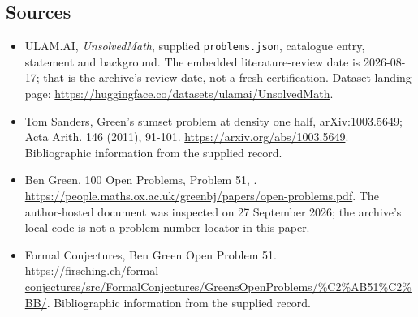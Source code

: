 \documentclass[11pt,a4paper]{article}
\begin{document}
\subsection{Sources}

{\small

\begin{itemize}

\item[\hypertarget{source:statement:1}{S1}] ULAM.AI, \emph{UnsolvedMath}, supplied \texttt{problems.json}, catalogue entry, statement and background. The embedded literature-review date is 2026-08-17; that is the archive’s review date, not a fresh certification. Dataset landing page: \url{https://huggingface.co/datasets/ulamai/UnsolvedMath}.

\item[\hypertarget{source:statement:2}{S2}] Tom Sanders, Green's sumset problem at density one half, arXiv:1003.5649; Acta Arith. 146 (2011), 91-101. \url{https://arxiv.org/abs/1003.5649}. Bibliographic information from the supplied record.

\item[\hypertarget{source:statement:3}{S3}] Ben Green, 100 Open Problems, Problem 51, . \url{https://people.maths.ox.ac.uk/greenbj/papers/open-problems.pdf}. The author-hosted document was inspected on 27 September 2026; the archive’s local code is not a problem-number locator in this paper.

\item[\hypertarget{source:statement:4}{S4}] Formal Conjectures, Ben Green Open Problem 51. \url{https://firsching.ch/formal-conjectures/src/FormalConjectures/GreensOpenProblems/%C2%AB51%C2%BB/}. Bibliographic information from the supplied record.

\end{itemize}

}

\label{end:statement}
\end{document}
